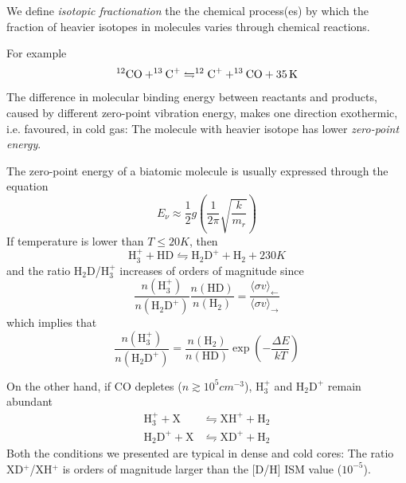 We define \emph{isotopic fractionation} the the chemical process(es) by which the fraction of heavier isotopes in molecules varies through chemical reactions.
\par For example 
\begin{equation*}
    \element{C}{12}{}\text{O} + ^{13}\text{C}^{+} \leftrightharpoons ^{12}\text{C}^{+} + \element{C}{13}{}\text{O} + 35\unit{K}
\end{equation*}
The difference in molecular binding energy between reactants
and products, caused by different zero-point vibration energy,
makes one direction exothermic, i.e. favoured, in cold gas: The molecule with heavier isotope has lower \emph{zero-point energy}.
\par The zero-point energy of a biatomic molecule is usually expressed through the equation
\begin{equation}
    E_{\nu} \approx \frac{1}{2}g\left(\frac{1}{2\pi}\sqrt{\frac{k}{m_{r}}}\right)
    \label{eq:zeropointenergy}
\end{equation}
If temperature is lower than $T \leq 20\unit{K}$, then 
\begin{equation*}
    \text{H}_{3}^{+} + \text{HD} \leftrightharpoons \text{H}_{2}\text{D}^{+} + \text{H}_{2} + 230\unit{K}
\end{equation*}
and the ratio H$_{2}$D/H$_{3}^{+}$ increases of orders of magnitude since 
\begin{equation*}
    \frac{n(\text{H}_{3}^{+})}{n(\text{H}_{2}\text{D}^{+})}\frac{n(\text{HD})}{n(\text{H}_{2})} = \frac{\langle \sigma v \rangle_{\leftarrow}}{\langle \sigma v \rangle_{\rightarrow}}
\end{equation*}
which implies that  
\begin{equation*}
    \frac{n(\text{H}_{3}^{+})}{n(\text{H}_{2}\text{D}^{+})} = \frac{n(\text{H}_{2})}{n(\text{HD})}\exp\left(-\frac{\Delta E}{kT}\right)
\end{equation*}
\par On the other hand, if CO depletes ($n \gtrsim 10^{5}\unit{cm}^{-3}$), H$_{3}^{+}$ and $\text{H}_{2}\text{D}^{+}$ remain abundant
\begin{align*}
    \text{H}_{3}^{+} + \text{X} &\leftrightharpoons \text{XH}^{+} + \text{H}_{2}\\
    \text{H}_{2}\text{D}^{+} + \text{X} &\leftrightharpoons \text{XD}^{+} + \text{H}_{2}
\end{align*}
Both the conditions we presented are typical in dense and cold cores: The ratio XD$^{+}$/XH$^{+}$ is orders of magnitude larger than the [D/H] ISM value ($10^{-5}$).